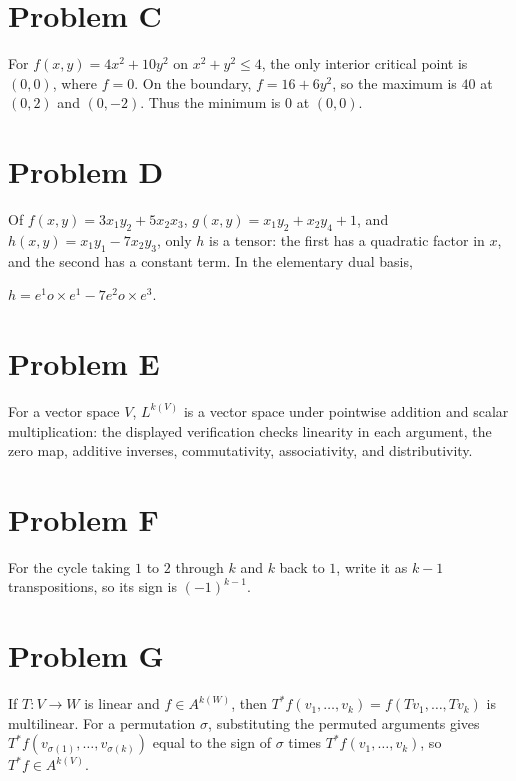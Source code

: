 \section{Problem C}

For \(f\left( {x,y} \right) = 4x^{2} + 10y^{2}\) on \(x^{2} + y^{2} \leq 4\), the only interior critical point is \(\left( {0,0} \right)\), where \(f = 0\). On the boundary, \(f = 16 + 6y^{2}\), so the maximum is \(40\) at \(\left( {0,2} \right)\) and \(\left( {0, - 2} \right)\). Thus the minimum is \(0\) at \(\left( {0,0} \right)\).

\section{Problem D}

Of \(f\left( {x,y} \right) = 3x_{1}y_{2} + 5x_{2}x_{3}\), \(g\left( {x,y} \right) = x_{1}y_{2} + x_{2}y_{4} + 1\), and \(h\left( {x,y} \right) = x_{1}y_{1} - 7x_{2}y_{3}\), only \(h\) is a tensor: the first has a quadratic factor in \(x\), and the second has a constant term. In the elementary dual basis,

\(h = e^{1}o \times e^{1} - 7e^{2}o \times e^{3}.\)

\section{Problem E}

For a vector space \(V\), \(L^{k{(V)}}\) is a vector space under pointwise addition and scalar multiplication: the displayed verification checks linearity in each argument, the zero map, additive inverses, commutativity, associativity, and distributivity.

\section{Problem F}

For the cycle taking \(1\) to \(2\) through \(k\) and \(k\) back to \(1\), write it as \(k - 1\) transpositions, so its sign is \(\left( {- 1} \right)^{k - 1}\).

\section{Problem G}

If \(T:V\rightarrow W\) is linear and \(f \in A^{k{(W)}}\), then \(T^{\ast}f\left( {v_{1},\ldots,v_{k}} \right) = f\left( {Tv_{1},\ldots,Tv_{k}} \right)\) is multilinear. For a permutation \(\sigma\), substituting the permuted arguments gives \(T^{\ast}f\left( {v_{\sigma{(1)}},\ldots,v_{\sigma{(k)}}} \right)\) equal to the sign of \(\sigma\) times \(T^{\ast}f\left( {v_{1},\ldots,v_{k}} \right)\), so \(T^{\ast}f \in A^{k{(V)}}\).

